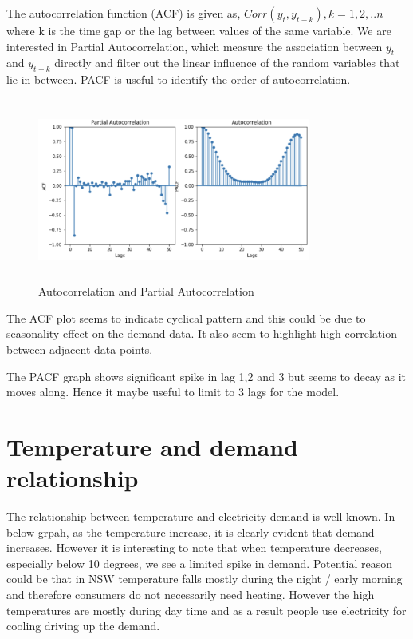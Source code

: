 \documentclass[mstat,12pt]{unswthesis}
\begin{document}
The autocorrelation function (ACF) is given as,
\(Corr(y_t,y_{t-k}),k=1,2,..n\) \cite{nist_2020_13512} where k is the
time gap or the lag between values of the same variable. We are
interested in Partial Autocorrelation, which measure the association
between \(y_t\) and \(y_{t-k}\) directly and filter out the linear
influence of the random variables that lie in between. PACF is useful to
identify the order of autocorrelation.

\begin{figure}[H]
\centering
\includegraphics[width=0.80\textwidth,height=6cm]{autocorrelation.png}
\caption{Autocorrelation and Partial Autocorrelation}
\label{autocorrelation}
\end{figure}

The ACF plot seems to indicate cyclical pattern and this could be due to
seasonality effect on the demand data. It also seem to highlight high
correlation between adjacent data points.

The PACF graph shows significant spike in lag 1,2 and 3 but seems to
decay as it moves along. Hence it maybe useful to limit to 3 lags for
the model.

\section{Temperature and demand
relationship}\label{temperature-and-demand-relationship}

The relationship between temperature and electricity demand is well
known. In below grpah, as the temperature increase, it is clearly
evident that demand increases. However it is interesting to note that
when temperature decreases, especially below 10 degrees, we see a
limited spike in demand. Potential reason could be that in NSW
temperature falls mostly during the night / early morning and therefore
consumers do not necessarily need heating. However the high temperatures
are mostly during day time and as a result people use electricity for
cooling driving up the demand.
\end{document}
